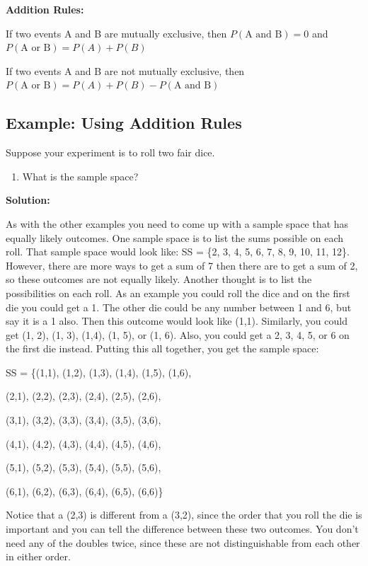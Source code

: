 \documentclass[
]{book}
\providecommand{\tightlist}{%
  \setlength{\itemsep}{0pt}\setlength{\parskip}{0pt}}
\begin{document}
\textbf{Addition Rules:}

If two events A and B are mutually exclusive, then \(P(\text{A and B})=0\) and \(P(\text{A or B})=P(A)+P(B)\)

If two events A and B are not mutually exclusive, then \(P(\text{A or B})=P(A)+P(B)-P(\text{A and B})\)

\hypertarget{example-using-addition-rules}{%
\subsection{Example: Using Addition Rules}\label{example-using-addition-rules}}

Suppose your experiment is to roll two fair dice.

\begin{enumerate}
\def\labelenumi{\alph{enumi}.}
\tightlist
\item
  What is the sample space?
\end{enumerate}

\textbf{Solution:}

As with the other examples you need to come up with a sample space that has equally likely outcomes. One sample space is to list the sums possible on each roll. That sample space would look like: SS = \{2, 3, 4, 5, 6, 7, 8, 9, 10, 11, 12\}. However, there are more ways to get a sum of 7 then there are to get a sum of 2, so these outcomes are not equally likely. Another thought is to list the possibilities on each roll. As an example you could roll the dice and on the first die you could get a 1. The other die could be any number between 1 and 6, but say it is a 1 also. Then this outcome would look like (1,1). Similarly, you could get (1, 2), (1, 3), (1,4), (1, 5), or (1, 6). Also, you could get a 2, 3, 4, 5, or 6 on the first die instead. Putting this all together, you get the sample space:

SS = \{(1,1), (1,2), (1,3), (1,4), (1,5), (1,6),

(2,1), (2,2), (2,3), (2,4), (2,5), (2,6),

(3,1), (3,2), (3,3), (3,4), (3,5), (3,6),

(4,1), (4,2), (4,3), (4,4), (4,5), (4,6),

(5,1), (5,2), (5,3), (5,4), (5,5), (5,6),

(6,1), (6,2), (6,3), (6,4), (6,5), (6,6)\}

Notice that a (2,3) is different from a (3,2), since the order that you roll the die is important and you can tell the difference between these two outcomes. You don't need any of the doubles twice, since these are not distinguishable from each other in either order.
\end{document}
